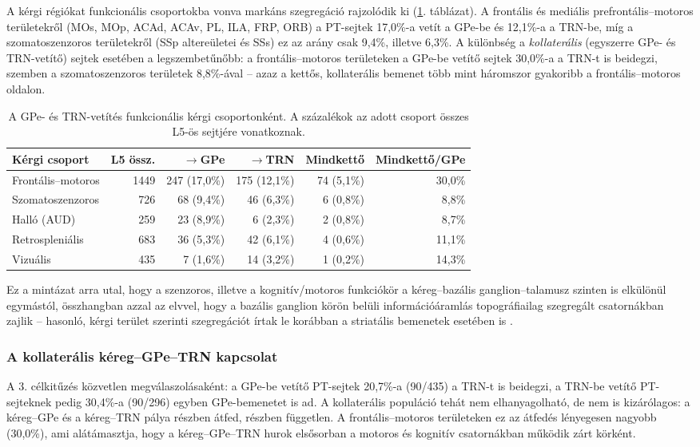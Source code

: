 A kérgi régiókat funkcionális csoportokba vonva markáns szegregáció
rajzolódik ki (\ref{tab:csoportok}. táblázat). A frontális és mediális
prefrontális--motoros területekről (MOs, MOp, ACAd, ACAv, PL, ILA, FRP, ORB)
a PT-sejtek 17,0\%-a vetít a GPe-be és 12,1\%-a a TRN-be, míg a
szomatoszenzoros területekről (SSp altereületei és SSs) ez az arány csak
9,4\%, illetve 6,3\%. A különbség a \emph{kollaterális} (egyszerre GPe- és
TRN-vetítő) sejtek esetében a legszembetűnőbb: a frontális--motoros
területeken a GPe-be vetítő sejtek 30,0\%-a a TRN-t is beidegzi, szemben a
szomatoszenzoros területek 8,8\%-ával -- azaz a kettős, kollaterális bemenet
több mint háromszor gyakoribb a frontális--motoros oldalon.

\begin{table}[ht]
\centering
\caption{A GPe- és TRN-vetítés funkcionális kérgi csoportonként.
A százalékok az adott csoport összes L5-ös sejtjére vonatkoznak.}
\label{tab:csoportok}
\begin{tabular}{lrrrrr}
\hline
Kérgi csoport & L5 össz. & $\rightarrow$GPe & $\rightarrow$TRN & Mindkettő & Mindkettő/GPe \\
\hline
Frontális--motoros & 1449 & 247 (17,0\%) & 175 (12,1\%) & 74 (5,1\%) & 30,0\% \\
Szomatoszenzoros & 726 & 68 (9,4\%) & 46 (6,3\%) & 6 (0,8\%) & 8,8\% \\
Halló (AUD) & 259 & 23 (8,9\%) & 6 (2,3\%) & 2 (0,8\%) & 8,7\% \\
Retrospleniális & 683 & 36 (5,3\%) & 42 (6,1\%) & 4 (0,6\%) & 11,1\% \\
Vizuális & 435 & 7 (1,6\%) & 14 (3,2\%) & 1 (0,2\%) & 14,3\% \\
\hline
\end{tabular}
\end{table}

Ez a mintázat arra utal, hogy a szenzoros, illetve a kognitív/motoros
funkciókör a kéreg--bazális ganglion--talamusz szinten is elkülönül
egymástól, összhangban azzal az elvvel, hogy a bazális ganglion körön belüli
információáramlás topográfiailag szegregált csatornákban zajlik -- hasonló,
kérgi terület szerinti szegregációt írtak le korábban a striatális bemenetek
esetében is \cite{hunnicutt2016}.

\subsubsection{A kollaterális kéreg--GPe--TRN kapcsolat}

A 3. célkitűzés közvetlen megválaszolásaként: a GPe-be vetítő PT-sejtek
20,7\%-a (90/435) a TRN-t is beidegzi, a TRN-be vetítő PT-sejteknek pedig
30,4\%-a (90/296) egyben GPe-bemenetet is ad. A kollaterális populáció tehát
nem elhanyagolható, de nem is kizárólagos: a kéreg--GPe és a kéreg--TRN pálya
részben átfed, részben független. A frontális--motoros területeken ez az
átfedés lényegesen nagyobb (30,0\%), ami alátámasztja, hogy a kéreg--GPe--TRN
hurok elsősorban a motoros és kognitív csatornákban működik zárt körként.

